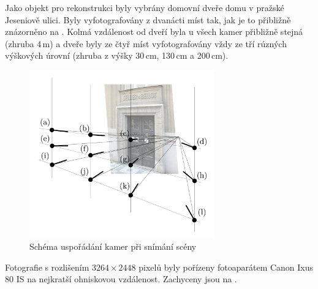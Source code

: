 \documentclass[11pt,oneside,a4paper,pdftex]{article}   %
\begin{document}
Jako objekt pro rekonstrukci byly vybrány domovní dveře domu v pražské Jeseniově ulici. Byly
vyfotografovány z dvanácti míst tak, jak je to přibližně znázorněno na .
Kolmá vzdálenost od dveří byla u všech kamer přibližně stejná (zhruba 4\,m) a dveře byly ze čtyř
míst vyfotografovány vždy ze tří rúzných výškových úrovní (zhruba z výšky 30\,cm, 130\,cm a
200\,cm).
	\begin{figure}[htb]
		\centering
		\includegraphics[width=8cm]{pictures/usporadani_kamer.pdf}
		\caption{Schéma uspořádání kamer při snímání scény}
		\label{fig:usporadaniKamer}
	\end{figure}
Fotografie s rozlišením $3264\times2448$ pixelů byly pořízeny fotoaparátem Canon Ixus 80
IS na nejkratší ohniskovou vzdálenost. Zachyceny jsou na .
\end{document}
